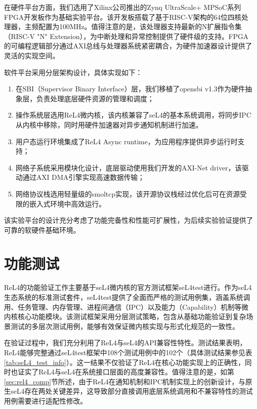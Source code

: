在硬件平台方面，我们选用了Xilinx公司推出的Zynq UltraScale+ MPSoC系列FPGA开发板\cite{xilinx2023zynq}作为基础实验平台。该开发板搭载了基于RISC-V架构的64位四核处理器，主频配置为100MHz。值得注意的是，该处理器支持最新的N扩展指令集（RISC-V "N" Extension），为中断处理和异常控制提供了硬件级的支持。FPGA的可编程逻辑部分通过AXI总线\cite{arm2023axi}与处理器系统紧密耦合，为硬件加速器设计提供了灵活的实现空间。

软件平台采用分层架构设计，具体实现如下：
\begin{enumerate}
    \item 在SBI（Supervisor Binary Interface）层，我们移植了opensbi v1.3\cite{opensbi}作为硬件抽象层，负责处理底层硬件资源的管理和调度；
    \item 操作系统层选用ReL4微内核，该内核兼容了seL4的基本系统调用，将同步IPC从内核中移除，同时用硬件加速器对异步通知机制进行加速。
    \item 用户态运行环境集成了ReL4 Async runtime，为应用程序提供异步运行时支持；
    \item 网络子系统采用模块化设计，底层驱动使用我们开发的AXI-Net driver\cite{axima-power-axinet}，该驱动通过AXI DMA引擎\cite{amd-axi-dma-controller}实现高速数据传输；
    \item 网络协议栈选用轻量级的smoltcp\cite{smoltcp-rs-smoltcp}实现，该开源协议栈经过优化后可在资源受限的嵌入式环境中高效运行。
\end{enumerate}

该实验平台的设计充分考虑了功能完备性和性能可扩展性，为后续实验验证提供了可靠的软硬件基础环境。
\section{功能测试}
ReL4的功能验证工作主要基于seL4微内核的官方测试框架seL4test\cite{sel4-sel4test}进行。作为seL4生态系统的标准测试套件，seL4test提供了全面而严格的测试用例集，涵盖系统调用、任务管理、内存管理、进程间通信（IPC）以及能力（Capability）机制等微内核核心功能模块。该测试框架采用分层测试策略，包含从基础功能验证到复杂场景测试的多层次测试用例，能够有效保证微内核实现与形式化规范的一致性。

在验证过程中，我们充分利用了ReL4与seL4的API兼容性特性。测试结果表明，ReL4能够完整通过seL4test框架中108个测试用例中的102个（具体测试结果参见表\ref{tab:seL4_test_info}）。这一结果不仅验证了ReL4在核心功能实现上的正确性，同时也证实了ReL4与seL4在系统接口层面的高度兼容性。值得注意的是，如第\ref{sec:rel4_comp}节所述，由于ReL4在通知机制和IPC机制实现上的创新设计，与原生seL4存在两处关键差异，这导致部分直接调用底层系统调用和不兼容特性的测试用例需要进行适配性修改。

